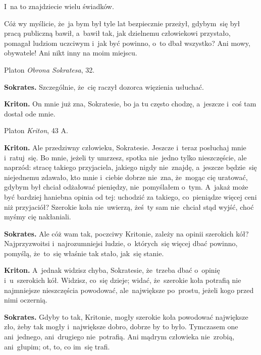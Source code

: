 \documentclass[a4paper,11pt]{article}
\newcommand{\attribA}[1]{#1}
\begin{document}
I~na to znajdziecie wielu świadków.

Cóż wy myślicie, że~ja bym był tyle lat bezpiecznie przeżył,
gdybym~się był pracą publiczną bawił, a~bawił tak, jak dzielnemu
człowiekowi przystało, pomagał ludziom uczciwym i~jak być powinno,
o~to dbał wszystko? Ani mowy, obywatele! Ani nikt inny na moim
miejscu.


\attribA{Platon \textit{Obrona Sokratesa}, 32.}

\vspace{\spaceThree}



\textbf{Sokrates.} Szczególnie, że~cię raczył dozorca więzienia usłuchać.

\textbf{Kriton.} On mnie już zna, Sokratesie, bo ja tu często chodzę, a~jeszcze i~coś tam dostał ode mnie.


\attribA{Platon \textit{Kriton}, 43 A.}

\vspace{\spaceThree}



\textbf{Kriton.} Ale przedziwny człowieku, Sokratesie. Jeszcze i~teraz posłuchaj mnie i~ratuj~się. Bo mnie, jeżeli ty umrzesz, spotka nie~jedno tylko nieszczęście, ale naprzód: stracę takiego przyjaciela, jakiego nigdy nie~znajdę, a~jeszcze będzie~się niejednemu zdawało, kto mnie i~ciebie dobrze nie~zna, że~mogąc cię uratować, gdybym był chciał odżałować pieniędzy, nie~pomyślałem o~tym. A~jakaż może być bardziej haniebna opinia od tej: uchodzić za takiego, co~pieniądze więcej ceni niż przyjaciół? Szerokie koła nie~uwierzą, żeś~ty sam nie~chciał stąd wyjść, choć myśmy cię nakłaniali.

\textbf{Sokrates.} Ale cóż wam tak, poczciwy Kritonie, zależy na opinii szerokich kół? Najprzyzwoitsi i~najrozumniejsi ludzie, o~których~się więcej dbać powinno, pomyślą, że~to~się właśnie tak stało, jak~się stanie.

\textbf{Kriton.} A~jednak widzisz chyba, Sokratesie, że~trzeba dbać o~opinię i~u~szerokich kół. Widzisz, co~się dzieje; widać, że~szerokie koła potrafią nie najmniejsze nieszczęścia powodować, ale~największe po~prostu, jeżeli kogo przed nimi oczernią.

\textbf{Sokrates.} Gdyby to tak, Kritonie, mogły szerokie koła powodować największe zło, żeby tak mogły i~największe dobro, dobrze by to było. Tymczasem one ani~jednego, ani~drugiego nie~potrafią. Ani mądrym człowieka nie~zrobią, ani~głupim; ot, to, co im~się trafi.
\end{document}
